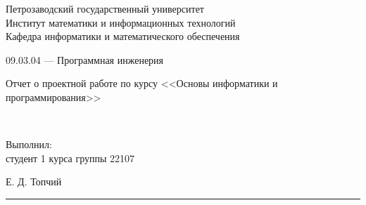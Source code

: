 \documentclass[a4paper,12pt]{article}
\newcommand{\myrule}[1]{\rule{#1}{0.4pt}}
\newcommand{\sign}[2][~]{{\small\myrule{#2}\\[-0.7em]\makebox[#2]{\it #1}}}
\renewcommand{\baselinestretch}{1.50}
\begin{document}

\thispagestyle{empty}
\begin{center}


\renewcommand{\baselinestretch}{1}
{\large
{\sc Петрозаводский государственный университет\\
Институт математики и информационных технологий\\
Кафедра информатики и математического обеспечения
}
}

\end{center}


\begin{center}
%
%
09.03.04 --- Программная инженерия  \\
\end{center}

\vfill

\begin{center}
{\normalsize 
	Отчет о проектной работе по курсу <<Основы информатики и программирования>>}

\medskip

	{\Large {}} \\
\end{center}

\medskip

\begin{flushright}
\parbox{11cm}{%
\renewcommand{\baselinestretch}{1.2}
\normalsize
	Выполнил:\\
студент 1 курса группы 22107
\begin{flushright}
	Е. Д. Топчий \sign[подпись]{4cm}
\end{flushright}


}
\end{flushright}
\end{document}
